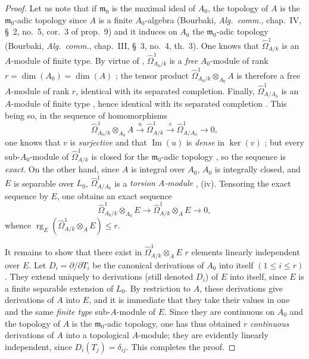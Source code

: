 \begin{proof}
Let us note that if $\mathfrak{m}_0$ is the maximal ideal of $A_0$, the topology of $A$ is the $\mathfrak{m}_0$-adic topology since $A$ is a finite $A_0$-algebra (Bourbaki, \emph{Alg.\ comm.}, chap.~IV, \S~2, no.~5, cor.~3 of prop.~9) and it induces on $A_0$ the $\mathfrak{m}_0$-adic topology (Bourbaki, \emph{Alg.\ comm.}, chap.~III, \S~3, no.~4, th.~3).
One knows  that $\widehat{\Omega}^1_{A/k}$ is an $A$-module of finite type.
By virtue of , $\widehat{\Omega}^1_{A_0/k}$ is a \emph{free} $A_0$-module of rank $r=\dim(A_0)=\dim(A)$ ; the tensor product $\widehat{\Omega}^1_{A_0/k}\otimes_{A_0}A$ is therefore a free $A$-module of rank $r$, identical with its separated completion.
Finally, $\widehat{\Omega}^1_{A/A_0}$ is an $A$-module of finite type , hence identical with its separated completion .
This being so, in the sequence of homomorphisms
\begin{equation}
\tag{21.9.5.2}
  \label{0.21.9.5.2}
  \widehat{\Omega}^1_{A_0/k}\otimes_{A_0} A\xrightarrow{u}\widehat{\Omega}^1_{A/k}\xrightarrow{v}\widehat{\Omega}^1_{A/A_0}\to 0,
\end{equation}
one knows that $v$ is \emph{surjective} and that $\operatorname{Im}(u)$ is \emph{dense} in $\ker(v)$ ; but every sub-$A_0$-module of $\widehat{\Omega}^1_{A/k}$ is closed for the $\mathfrak{m}_0$-adic topology , so the sequence  is \emph{exact}.
On the other hand, since $A$ is integral over $A_0$, $A_0$ is integrally closed, and $E$ is separable over $L_0$, $\widehat{\Omega}^1_{A/A_0}$ is a \emph{torsion $A$-module} , (iv).
Tensoring the exact sequence  by $E$, one obtains an exact sequence
\[
  \widehat{\Omega}^1_{A_0/k}\otimes_{A_0}E\longrightarrow
  \widehat{\Omega}^1_{A/k}\otimes_A E\longrightarrow 0,
\]
whence $\operatorname{rg}_E(\widehat{\Omega}^1_{A/k}\otimes_AE)\leqslant r$.

It remains to show that there exist in $\widehat{\Omega}^1_{A/k}\otimes_AE$ $r$ elements linearly independent over $E$.
Let $D_i=\partial/\partial T_i$ be the canonical derivations of $A_0$ into itself $(1\leqslant i\leqslant r)$.
They extend uniquely to derivations (still denoted $D_i$) of $E$ into itself, since $E$ is a finite separable extension of $L_0$.
By restriction to $A$, these derivations give derivations of $A$ into $E$, and it is immediate that they take their values in one and the same \emph{finite type} sub-$A$-module of $E$.
Since they are continuous on $A_0$ and the topology of $A$ is the $\mathfrak{m}_0$-adic topology, one has thus obtained $r$ \emph{continuous} derivations of $A$ into a topological $A$-module; they are evidently linearly independent, since $D_i(T_j)=\delta_{ij}$.
This completes the proof.
\end{proof}

